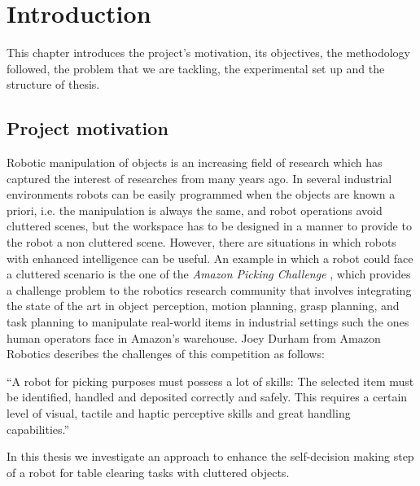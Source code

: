 
\chapter{Introduction}
\label{ch:introduction}

This chapter introduces the project's motivation, its objectives, the methodology followed, the problem that we are tackling, the experimental set up and the structure of thesis.



\section{Project motivation}
Robotic manipulation of objects is an increasing field of research which has captured the interest of researches from many years ago. In several industrial environments robots can be easily programmed when the objects are known a priori, i.e. the manipulation is always the same, and robot operations avoid cluttered scenes, but the workspace has to be designed in a manner to provide to the robot a non cluttered scene. However, there are situations in which robots with enhanced intelligence can be useful.
 An example in which a robot could face a cluttered scenario is the one of the \textit{Amazon Picking Challenge} \citep{APC}, which provides a challenge problem to the robotics research community that involves integrating the state of the art in object perception, motion planning, grasp planning, and task planning to manipulate real-world items in industrial settings such the ones human operators face in Amazon's warehouse. Joey Durham from Amazon Robotics describes the challenges of this competition as follows:
\begin{displayquote}
 “A robot for picking purposes must possess a lot of skills: The selected item must be identified, handled and deposited correctly and safely. This requires a certain level of visual, tactile and haptic perceptive skills and great handling capabilities.”
\end{displayquote}

In this thesis we investigate an approach to enhance the self-decision making step of a robot for table clearing tasks with cluttered objects.


